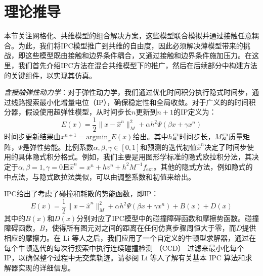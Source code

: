 \section{理论推导}

本节关注网格化、共维模型的组合解决方案，这些模型联合模拟并通过接触任意耦合。为此，我们将IPC模型推广到共维的自由度，因此必须解决薄模型带来的挑战，即这些模型既由接触和边界条件耦合，又通过接触和边界条件施加压力。在这里，我们首先介绍IPC方法在混合共维模型下的推广，然后在后续部分中构建方法的关键组件，以实现其仿真。

\textit{含接触弹性动力学}：对于弹性动力学，我们通过优化时间积分执行隐式时间步，通过线路搜索最小化增量电位（IP），确保稳定性和全局收敛。对于广义的的时间积分器，假设使用超弹性模型，从时间步长$n$更新到$n + 1$的IP定义为：
\begin{equation}
  E(x) = \frac{1}{2}\| x - \hat{x}^n \|_M^2 + 
  \alpha h^2\Psi (\beta x +\gamma x^n)
\end{equation}
时间步更新结果由$x^{n+1}=\mathrm{argmin}_xE(x)$给出。其中$h$是时间步长，$M$是质量矩阵，$\Psi$是弹性势能。比例系数$\alpha,\beta, \gamma \in [0, 1]$和预测的迭代初值$\hat x^n$决定了时间步使用的具体隐式积分格式。例如，我们主要是用图形学标准的隐式欧拉积分法，其决定于$\alpha,\beta = 1, \gamma = 0$且$\hat x^n = x^n + hv^n + h^2 M^{-1} f_{\mathrm{ext}}$。其他的隐式方法，例如隐式的中点法，与隐式欧拉法类似，可以由调整系数和初值来给出。

IPC给出了考虑了碰撞和耗散的势能函数，即IP：
\begin{equation}\label{eq2}
  E(x) = \frac{1}{2} \|x-\hat{x}^n\|_M^2 + \alpha h^2 \Psi(\beta x + \gamma x^n) + B(x) + D(x)
\end{equation}
其中的$B(x)$和$D(x)$分别对应了IPC模型中的碰撞障碍函数和摩擦势函数。碰撞障碍函数，$B$，使得所有图元对之间的距离在任何仿真步骤周恒大于零，而$D$提供相应的摩擦力。在 Li 等人之后，我们应用了一个自定义的牛顿型求解器，通过在每个牛顿迭代的每次行搜索中执行连续碰撞检测 （CCD） 过滤来最小化每个 IP，以确保整个过程中无交集轨迹。请参阅 Li 等人了解有关基本 IPC 算法和求解器实现的详细信息。

